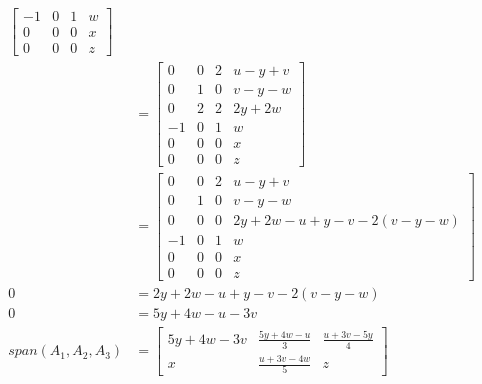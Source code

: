 \documentclass[letterpaper, 12pt]{math}
\begin{document}
\begin{align*}
\begin{bmatrix}
    -1 & 0 & 1 & w \\
    0 & 0 & 0 & x \\
    0 & 0 & 0 & z
  \end{bmatrix} \\
  &= \begin{bmatrix}
    0 & 0 & 2 & u-y+v \\
    0 & 1 & 0 & v-y-w \\
    0 & 2 & 2 & 2y+2w \\
    -1 & 0 & 1 & w \\
    0 & 0 & 0 & x \\
    0 & 0 & 0 & z
  \end{bmatrix} \\
  &= \begin{bmatrix}
    0 & 0 & 2 & u-y+v \\
    0 & 1 & 0 & v-y-w \\
    0 & 0 & 0 & 2y+2w-u+y-v-2(v-y-w) \\
    -1 & 0 & 1 & w \\
    0 & 0 & 0 & x \\
    0 & 0 & 0 & z
  \end{bmatrix} \\
  0 &= 2y+2w-u+y-v-2(v-y-w) \\
  0 &= 5y+4w-u-3v \\
  span(A_1,A_2,A_3) &= \begin{bmatrix}
    5y+4w-3v & \frac{5y+4w-u}{3} & \frac{u+3v-5y}{4} \\
    x & \frac{u+3v-4w}{5} & z
  \end{bmatrix}
\end{align*}
\end{document}
